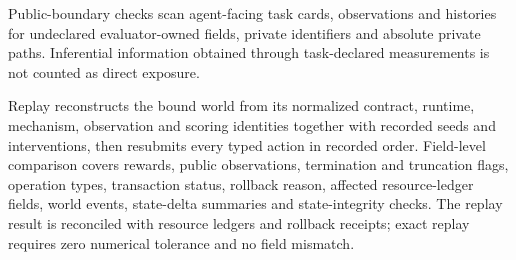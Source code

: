 \documentclass[10pt,twocolumn]{article}
\begin{document}
Public-boundary checks scan agent-facing task cards, observations and
histories for undeclared evaluator-owned fields, private identifiers and
absolute private paths. Inferential information obtained through
task-declared measurements is not counted as direct exposure.

Replay reconstructs the bound world from its normalized contract,
runtime, mechanism, observation and scoring identities together with
recorded seeds and interventions, then resubmits every typed action in
recorded order. Field-level comparison covers rewards, public
observations, termination and truncation flags, operation types,
transaction status, rollback reason, affected resource-ledger fields,
world events, state-delta summaries and state-integrity checks. The
replay result is reconciled with resource ledgers and rollback receipts;
exact replay requires zero numerical tolerance and no field mismatch.
\end{document}
